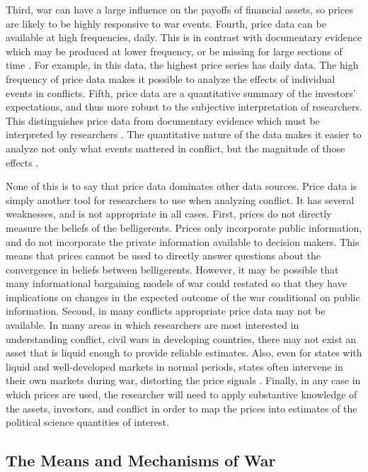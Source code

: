 Third, war can have a large influence on the payoffs of financial assets, so prices are likely to be highly responsive to war events.
Fourth, price data can be available at high frequencies, \eg{}daily.
This is in contrast with documentary evidence which may be produced at lower frequency, or be missing for large sections of time \parencite[][57]{Reiter2009}. For example, in this data, the highest price series has daily data.
The high frequency of price data makes it possible to analyze the effects of individual events in conflicts.
Fifth, price data are a quantitative summary of the investors' expectations, and thus more robust to the subjective interpretation of researchers.
This distinguishes price data from documentary evidence which must be interpreted by researchers \parencite[][58]{Reiter2009}.
The quantitative nature of the data makes it easier to analyze not only what events mattered in conflict, but the magnitude of those effects \parencite{north2000introd}.

None of this is to say that price data dominates other data sources.
Price data is simply another tool for researchers to use when analyzing conflict. It has several weaknesses, and is not appropriate in all cases.
First, prices do not directly measure the beliefs of the belligerents. Prices only incorporate public information, and do not incorporate the private information available to decision makers.
This means that prices cannot be used to directly answer questions about the convergence in beliefs between belligerents.
However, it may be possible that many informational bargaining models of war could restated so that they have implications on changes in the expected outcome of the war conditional on public information.
Second, in many conflicts appropriate price data may not be available.
In many areas in which researchers are most interested in understanding conflict, \eg{}civil wars in developing countries, there may not exist an asset that is liquid enough to provide reliable estimates.
Also, even for states with liquid and well-developed markets in normal periods, states often intervene in their own markets during war, distorting the price signals \parencite[12]{HaberMitchenerOosterlinckEtAl2015}. Finally, in any case in which prices are used, the researcher will need to apply substantive knowledge of the assets, investors, and conflict in order to map the prices into estimates of the political science quantities of interest.




\subsection{The Means and Mechanisms of War}
\label{bonds_battles:sec:means-mechanisms-war}

